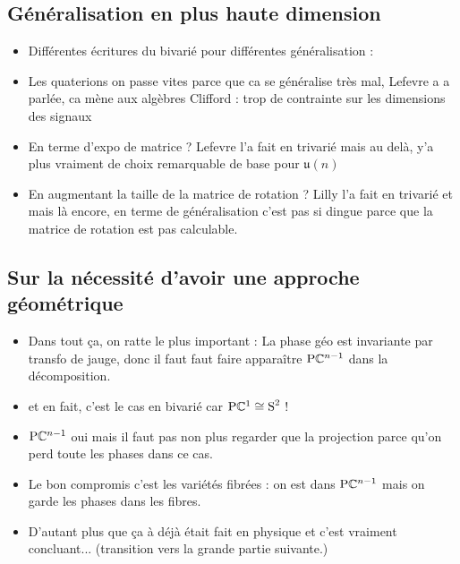 \subsection{Généralisation en plus haute dimension} \label{subsec:gene_AM-FM-PM}

\begin{itemize}
	
	\item Différentes écritures du bivarié pour différentes généralisation :
	
	\item Les quaterions on passe vites parce que ca se généralise très mal, Lefevre a a parlée, ca mène aux algèbres Clifford : trop de contrainte sur les dimensions des signaux
	
	\item En terme d'expo de matrice ? Lefevre \cite[sec. I.3]{lefevre_polarization_2021} l'a fait en trivarié mais au delà, y'a plus vraiment de choix remarquable de base pour $\mathfrak{u}(n)$
	
	\item En augmentant la taille de la matrice de rotation ? Lilly \cite{lilly_modulated_2011} l'a fait en trivarié et mais là encore, en terme de généralisation c'est pas si dingue parce que la matrice de rotation est pas calculable.
	
\end{itemize}
	


\subsection{Sur la nécessité d'avoir une approche géométrique}\label{subsec:aller_plus_loin}
\begin{itemize}
	
	\item Dans tout ça, on ratte le plus important : La phase géo est invariante par transfo de jauge, donc il faut faut faire apparaître $\text{\normalfont P}\mathbb{C}^{n-1}$ dans la décomposition.
	
	\item et en fait, c'est le cas en bivarié car $\text{\normalfont P}\mathbb{C}^{1}\cong \text{\normalfont S}^{2}$ !
	
	\item $\text{\normalfont P}\mathbb{C}^{n-1}$ oui mais il faut pas non plus regarder que la projection parce qu'on perd toute les phases dans ce cas.
	
	\item Le bon compromis c'est les variétés fibrées : on est dans $\text{\normalfont P}\mathbb{C}^{n-1}$ mais on garde les phases dans les fibres.
	
	\item D'autant plus que ça à déjà était fait en physique et c'est vraiment concluant... (transition vers la grande partie suivante.)
	
\end{itemize}





